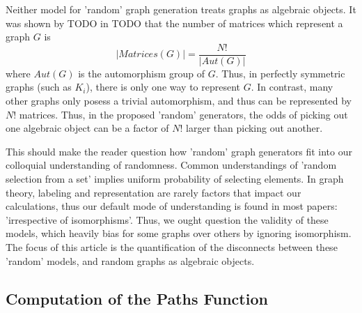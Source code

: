 \documentclass[a4paper,12pt]{article}
\begin{document}
Neither model for 'random' graph generation treats graphs as algebraic objects.
It was shown by TODO in TODO that the number of matrices which represent a graph \(G\) is
\[| Matrices(G) | = \frac{N!}{| Aut(G) |}\]
where \(Aut(G)\) is the automorphism group of \(G\).
Thus, in perfectly symmetric graphs (such as \(K_i\)), there is only one way to represent \(G\).
In contrast, many other graphs only posess a trivial automorphism, and thus can be represented by \(N!\) matrices.
Thus, in the proposed 'random' generators, the odds of picking out one algebraic object can be a factor of \(N!\) larger than picking out another. 

This should make the reader question how 'random' graph generators fit into our colloquial understanding of randomness.
Common understandings of 'random selection from a set' implies uniform probability of selecting elements.
In graph theory, labeling and representation are rarely factors that impact our calculations, thus our default mode of understanding is found in most papers: 'irrespective of isomorphisms'.
Thus, we ought question the validity of these models, which heavily bias for some graphs over others by ignoring isomorphism.
The focus of this article is the quantification of the disconnects between these 'random' models, and random graphs as algebraic objects.

\subsection{Computation of the Paths Function}
\end{document}
